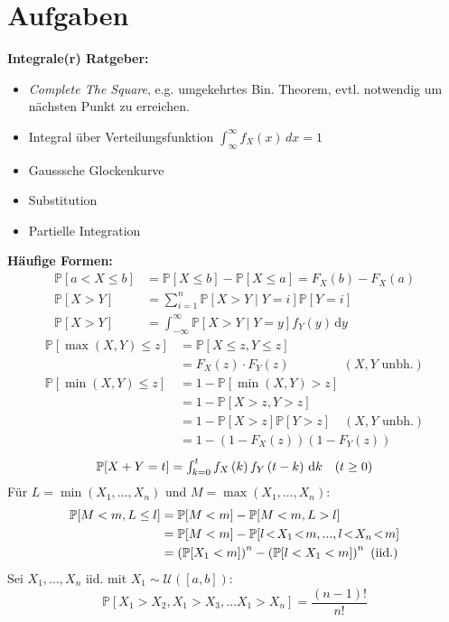 \section{Aufgaben}

\textbf{Integrale(r) Ratgeber:}
\begin{itemize}
    \item \textit{Complete The Square}, e.g. umgekehrtes Bin. Theorem, evtl. notwendig um nächsten Punkt zu erreichen.
    \item Integral über Verteilungsfunktion $\int_{\infty}^{\infty} f_{X}(x) \, dx = 1$
    \item Gausssche Glockenkurve
    \item Substitution
    \item Partielle Integration
\end{itemize}

\textbf{Häufige Formen:}
$$
\begin{aligned}
\mathbb{P}[a<X \leq b]&=\mathbb{P}[X \leq b]-\mathbb{P}[X \leq a]=F_X(b)-F_X(a)\\
\mathbb{P}[X > Y] &= \textstyle \sum_{i=1}^n \mathbb{P}[X > Y \mid Y = i] \mathbb{P}[Y = i] \\
\mathbb{P}[X > Y] &= \textstyle \int_{-\infty}^{\infty} \mathbb{P}[X > Y \mid Y = y] f_Y(y) \, \text{d}y
\end{aligned}
$$
$$
\begin{aligned}
\mathbb{P}[\max (X,Y)\leq z] &= \mathbb{P}[X\leq z, Y \leq z]\\
&= F_X(z) \cdot F_Y(z) \qquad\qquad \ (X, Y\text{ unbh.})\\
\mathbb{P}[\min (X,Y)\leq z] &= 1 - \mathbb{P}[\min(X,Y)>z]\\
&=1 - \mathbb{P}[X>z, Y>z]\\
&=1 - \mathbb{P}[X>z] \mathbb{P}[Y>z]  \quad(X, Y\text{ unbh.})\\
&=1 - \left(1-F_X(z)\right)\left(1-F_Y(z)\right)
\end{aligned}
$$
$$
\mathbb{P}[X+Y=t]=\textstyle \int_{k=0}^t f_X\left(k\right) f_Y\left(t-k\right)\, \text{d}k \quad (t\geq 0)\\
$$
Für $L=\min \left(X_1, \dots, X_n\right)$ und $M=\max \left(X_1, \dots, X_n\right)$:
$$
\begin{aligned} 
\P[M<m, L \leq l] & =\P[M<m]-\P[M<m, L>l] \\ 
&= \P[M<m]-\P[l\!<\!X_1\!<\!m, ..., l\!<\!X_n\!<\!m]\\
&= \left( \P[X_1 < m] \right)^n - \left( \P[l < X_1 < m] \right)^n \ (\text{iid.}) 
\end{aligned}
$$
Sei $X_{1},\dots, X_{n}$ iid. mit $X_{1}\sim \mathcal{U}([a,b])$:
$$\textstyle \mathbb{P}[X_{1}>X_{2},X_{1}>X_{3},\dots X_{1}>X_{n}]=\frac{(n-1)!}{n!}$$


